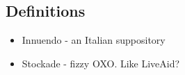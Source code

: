 \documentclass[11pt]{article}
\begin{document}
\subsection*{Definitions}
\begin{itemize}
\item Innuendo - an Italian suppository
\item Stockade - fizzy OXO. Like LiveAid?
\end{itemize}
\end{document}
